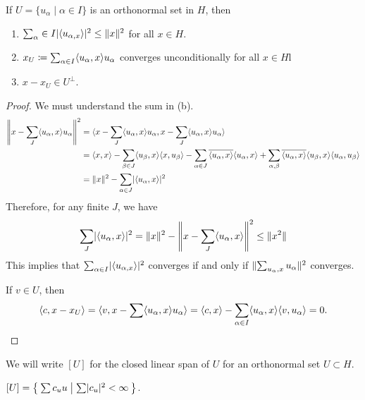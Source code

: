 \documentclass[10pt, twoside]{article}
\begin{document}
    \begin{thm}[Bessel]
        If $U = \{u_{\alpha} \mid \alpha \in I\}$ is an orthonormal set in $H$, then
        \begin{enumerate}[label=(\alph*)]
            \item $\sum_{\alpha }\in I \abs{\gen{u_{\alpha,x}}}^2 \leq \norm{x}^2$ for all $x \in H$.
            \item $x_U \coloneqq \sum_{\alpha \in I} \gen{u_{\alpha},x} u_{\alpha}$ converges unconditionally for all $x \in H$l
            \item $x-x_U \in U^{\perp}$.
        \end{enumerate}

        \begin{proof}
            We must understand the sum in (b).
            \begin{align*}
                \norm*{x-\sum_J \gen{u_{\alpha},x} u_{\alpha}}^2 &= \gen{x-\sum_J \gen{u_{\alpha},x} u_{\alpha}, x-\sum_J \gen{u_{\alpha},x} u_{\alpha}} \\
                                                                 &= \gen{x,x} - \sum_{\beta \in J} \gen{u_{\beta},x}\gen{x,u_{\beta}} - \sum_{\alpha \in J} \overline{\gen{u_{\alpha},x}} \gen{u_{\alpha},x} + \sum_{\alpha,\beta} \overline{\gen{u_{\alpha},x}}\gen{u_{\beta},x}\gen{u_{\alpha},u_{\beta}} \\
                                                                 &= \norm{x}^2 - \sum_{\alpha \in J} \abs{\gen{u_{\alpha},x}}^2
            \end{align*}
            Therefore, for any finite $J$, we have \[\sum_J \abs{\gen{u_{\alpha},x}}^2 = \norm{x}^2 - \norm*{x - \sum_J \gen{u_{\alpha},x}}^2 \leq \norm{x^2}\]
            This implies that $\sum_{\alpha \in I} \abs{\gen{u_{\alpha,x}}}^2 $ converges if and only if
            $\norm{\sum_{u_{\alpha},x}u_{\alpha}}^2$ converges.

            If $v \in U$, then \[\gen{c,x-x_U} = \gen{v,x - \sum \gen{u_{\alpha},x} u_{\alpha}} = \gen{c,x} - \sum_{\alpha \in I} \gen{u_{\alpha},x} \gen{v,u_{\alpha}} = 0. \]
        \end{proof}
    \end{thm}
    
    We will write $[U]$ for the closed linear span of $U$ for an orthonormal set $U \subset H$.

    \begin{thm}
        $[U] = \Set{ \sum c_u u | \sum \abs{c_u}^2 < \infty }$.
    \end{thm}
\end{document}
